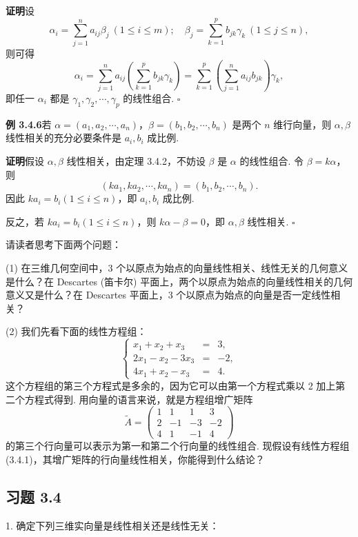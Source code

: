 \documentclass[UTF8, 12pt, fontset=fandol, oneside]{ctexart}
\begin{document}
\noindent\textbf{证明}\quad 设
\[
\alpha_i=\sum_{j=1}^{n}a_{ij}\beta_j\ (1\leq i\leq m);\quad \beta_j=\sum_{k=1}^{p}b_{jk}\gamma_k\ (1\leq j\leq n),
\]
则可得
\[
\alpha_i=\sum_{j=1}^{n}a_{ij}\left(\sum_{k=1}^{p}b_{jk}\gamma_k\right)=\sum_{k=1}^{p}\left(\sum_{j=1}^{n}a_{ij}b_{jk}\right)\gamma_k,
\]
即任一 $\alpha_i$ 都是 $\gamma_1,\gamma_2,\cdots,\gamma_p$ 的线性组合. $\square$

\noindent\textbf{例 3.4.6}\quad 若 $\alpha=(a_1,a_2,\cdots,a_n)$，$\beta=(b_1,b_2,\cdots,b_n)$ 是两个 $n$ 维行向量，则 $\alpha,\beta$ 线性相关的充分必要条件是 $a_i,b_i$ 成比例.

\noindent\textbf{证明}\quad 假设 $\alpha,\beta$ 线性相关，由定理 3.4.2，不妨设 $\beta$ 是 $\alpha$ 的线性组合. 令 $\beta=k\alpha$，则
\[
(ka_1,ka_2,\cdots,ka_n)=(b_1,b_2,\cdots,b_n).
\]
因此 $ka_i=b_i(1\leq i\leq n)$，即 $a_i,b_i$ 成比例.

反之，若 $ka_i=b_i(1\leq i\leq n)$，则 $k\alpha-\beta=0$，即 $\alpha,\beta$ 线性相关. $\square$

请读者思考下面两个问题：

(1) 在三维几何空间中，3 个以原点为始点的向量线性相关、线性无关的几何意义是什么？在 Descartes (笛卡尔) 平面上，两个以原点为始点的向量线性相关的几何意义又是什么？在 Descartes 平面上，3 个以原点为始点的向量是否一定线性相关？

(2) 我们先看下面的线性方程组：
\[
\left\{
\begin{array}{rcl}
x_1+x_2+x_3&=&3,\\
2x_1-x_2-3x_3&=&-2,\\
4x_1+x_2-x_3&=&4.
\end{array}
\right.
\]
这个方程组的第三个方程式是多余的，因为它可以由第一个方程式乘以 2 加上第二个方程式得到. 用向量的语言来说，就是方程组增广矩阵
\begin{equation}
\widetilde{A}=
\left(\begin{array}{rrrr}
1&1&1&3\\
2&-1&-3&-2\\
4&1&-1&4
\end{array}\right)
\tag{3.4.5}
\end{equation}
的第三个行向量可以表示为第一和第二个行向量的线性组合. 现假设有线性方程组 (3.4.1)，其增广矩阵的行向量线性相关，你能得到什么结论？

\subsection*{习题 3.4}

1. 确定下列三维实向量是线性相关还是线性无关：
\end{document}
